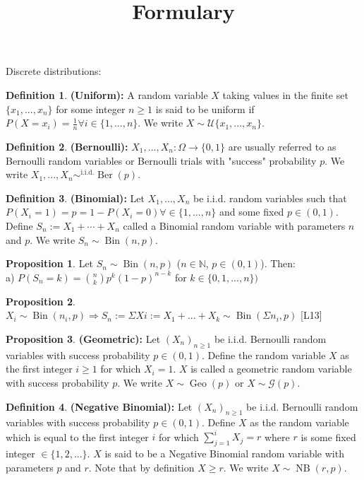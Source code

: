 \documentclass[11pt]{article}
\title{\textbf{Formulary}}
\theoremstyle{definition}
\DeclareMathOperator{\Ber}{Ber}
\DeclareMathOperator{\Bin}{Bin}
\DeclareMathOperator{\Geo}{Geo}
\DeclareMathOperator{\NB}{NB}
\DeclareMathOperator{\iid}{i.i.d.}
\newtheorem{prop}{Proposition}
\newtheorem{defn}{Definition}
\begin{document}
\maketitle
\thispagestyle{empty}

Discrete distributions:

\begin{defn}\textbf{(Uniform):}
A random variable $X$ taking values in the finite set $\{x_1,...,x_n\}$ for some integer $n\geq 1$ is said to be uniform if $P(X=x_i)=\frac{1}{n}\forall i\in\{1,...,n\}$. We write $X\sim\mathcal{U}\{x_1,...,x_n\}$.
\end{defn}

\begin{defn}\textbf{(Bernoulli):}
$X_1,...,X_n:\Omega\rightarrow\{0,1\}$ are usually referred to as Bernoulli random variables or Bernoulli trials with "success" probability $p$. We write $X_1,...,X_n\sim^{\iid}\Ber(p)$.
\end{defn}

\begin{defn}\textbf{(Binomial):}
Let $X_1,...,X_n$ be i.i.d. random variables such that $P(X_i=1)=p=1-P(X_i=0)\forall\in\{1,...,n\}$ and some fixed $p\in (0,1)$.\\
Define $S_n:=X_1+\cdots+X_n$ called a Binomial random variable with parameters $n$ and $p$. We write $S_n\sim \Bin(n,p)$.
\end{defn}

\begin{prop}
Let $S_n\sim \Bin(n,p)$ ($n\in\mathbb{N}$, $p\in(0,1)$). Then:\\
a) $P(S_n=k)={n\choose{k}}p^k(1-p)^{n-k}$ for $k\in\{0,1,...,n\})$
\end{prop}

\begin{prop}
$X_i\sim \Bin(n_i,p) \Rightarrow S_n:= \Sigma Xi := X_1+...+X_k\sim  \Bin(\Sigma n_i , p)$ [L13]
\end{prop}

\begin{prop}\textbf{(Geometric):}
Let $(X_n)_{n\geq 1}$ be i.i.d. Bernoulli random variables with success probability $p\in(0,1)$. Define the random variable $X$ as the first integer $i\geq 1$ for which $X_i=1$. $X$ is called a geometric random variable with success probability $p$. We write $X\sim \Geo(p)$ or $X\sim\mathcal{G}(p)$.
\end{prop}

\begin{defn}\textbf{(Negative Binomial):}
Let $(X_n)_{n\geq 1}$ be i.i.d. Bernoulli random variables with success probability $p\in (0,1)$. Define $X$ as the random variable which is equal to the first integer $i$ for which $\sum^i_{j=1} X_j=r$ where $r$ is some fixed integer $\in\{1,2,...\}$. $X$ is said to be a Negative Binomial random variable with parameters $p$ and $r$. Note that by definition $X\geq r$. We write $X\sim \NB(r,p).$
\end{defn}
\end{document}

